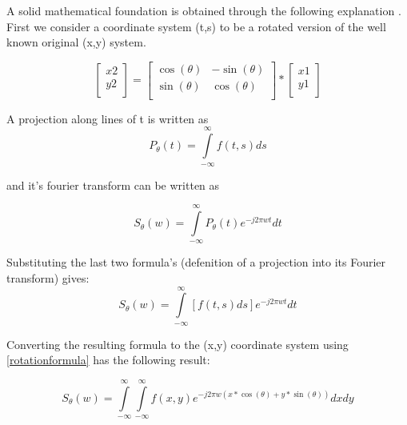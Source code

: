 \documentclass[9pt,journal,compsoc,twoside, a4paper]{elab}
\begin{document}
A solid mathematical foundation is obtained through the following explanation \cite{POCT1}. First we consider a coordinate system (t,s) to be a rotated version of the well known original (x,y) system.

\begin{equation}
\label{rotationformula}
\left[ \begin{array}{l}
 x2 \\ 
 y2 \\ 
 \end{array} \right] = \left[ \begin{array}{l}
 \cos (\theta) \\ 
 \sin (\theta) \\ 
 \end{array} \right.\left. \begin{array}{l}
  -\sin (\theta) \\ 
 \cos (\theta) \\ 
 \end{array} \right]*\left[ \begin{array}{l}
 x1 \\ 
 y1 \\ 
 \end{array} \right]
\end{equation}	
%
\par A projection along lines of t is written as 
%
\begin{equation}
P_\theta  (t) = \int\limits_{ - \infty }^\infty  {f(t,s)ds} 	
\end{equation}

 \par
and it's fourier transform can be written as 

\begin{equation}
	S_\theta  (w) = \int\limits_{ - \infty }^\infty  {P_\theta  (t)e^{ - j2\pi wt} dt} 
\end{equation}

Substituting the last two formula's (defenition of a projection into its Fourier transform) gives:
\begin{equation}
	S_\theta  (w) = \int\limits_{ - \infty }^\infty  {\left[ {f(t,s)ds} \right]e^{ - j2\pi wt} dt} 	
\end{equation}

Converting the resulting formula to the (x,y) coordinate system using \eqref{rotationformula} has the following result:

\begin{equation}
	S_\theta  (w) = \int\limits_{ - \infty }^\infty  {\int\limits_{ - \infty }^\infty  {f(x,y)e^{ - j2\pi w(x*\cos (\theta ) + y*\sin (\theta ))} dxdy} } 
	\label{convert}
\end{equation}
\end{document}
